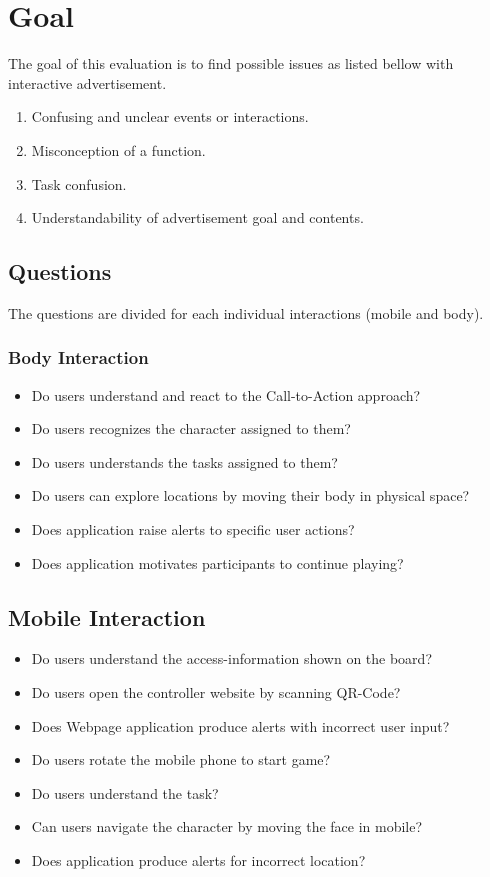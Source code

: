 \section{Goal}
The goal of this evaluation is to find possible issues as listed bellow with interactive advertisement. 

\begin{enumerate}
\item   Confusing and unclear events or interactions.
\item   Misconception of a function.
\item   Task confusion.
\item   Understandability of advertisement goal and contents.
\end{enumerate}


\subsection{Questions}
The questions are divided for each individual interactions (mobile and body).

\subsubsection{Body Interaction}

\begin{itemize}
\item  Do users understand and react to the Call-to-Action approach?
\item  Do users recognizes the character assigned to them?
\item  Do users understands the tasks assigned to them?
\item  Do users can explore locations by moving their body in physical space?
\item  Does application raise alerts to specific user actions?
\item  Does application motivates participants to continue playing?
\end{itemize}

\subsection{Mobile Interaction}

\begin{itemize}
\item Do users understand the access-information shown on the board?
\item Do users open the controller website by scanning QR-Code?
\item Does Webpage application produce alerts with incorrect user input?
\item Do users rotate the mobile phone to start game?
\item Do users understand the task?
\item Can users navigate the character by moving the face in mobile?
\item Does application produce alerts for incorrect location?
\end{itemize}


